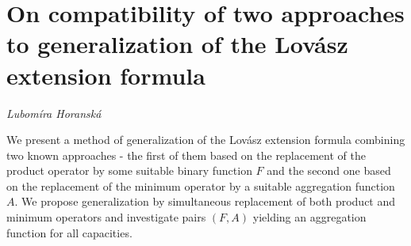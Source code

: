 \documentclass[../booklet.tex]{subfiles}
\begin{document}
\section[On compatibility of two approaches to generalization of the Lovász extension formula. {\it Lubomíra Horanská}]{On compatibility of two approaches to generalization of the Lovász extension formula}

\begin{center}
  {\it Lubomíra Horanská}
\end{center}

\vskip 0.8cm


We present a method of generalization of the Lov\'asz extension formula combining two known approaches - the first of them based on the replacement of the product operator by some suitable binary function $F$ and the second one based on the replacement of the minimum operator by a suitable aggregation function $A$. We propose generalization by simultaneous replacement of both product and minimum operators and investigate pairs $(F,A)$ yielding an aggregation function for all capacities. 
\end{document}
